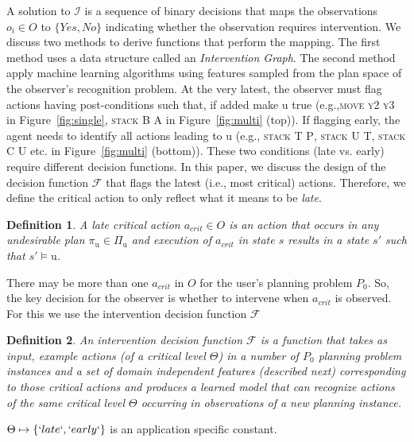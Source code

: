\documentclass[letterpaper]{article}
\theoremstyle{plain}
\newtheorem{definition}{Definition}
\begin{document}
A solution to $\mathcal{I}$ is a sequence of binary decisions that maps the observations $o_i\in O$ to $\lbrace Yes,No\rbrace$ indicating whether the observation requires intervention. 
We discuss two methods to derive functions that perform the mapping. 
The first method uses a data structure called an \textit{Intervention Graph}. 
The second method apply machine learning algorithms using features sampled from the plan space of the observer's recognition problem.
At the very latest, the observer must flag actions having post-conditions such that, if added make $\mathrm{u}$ true (e.g.,\textsc{move y2 y3} in Figure~\ref{fig:single}, \textsc{stack B A} in Figure~\ref{fig:multi} (top)). 
If flagging early, the agent needs to identify all actions leading to $\mathrm{u}$ (e.g., \textsc{stack T P}, \textsc{stack U T}, \textsc{stack C U} etc. in Figure~\ref{fig:multi} (bottom)). 
These two conditions (late vs. early) require different decision functions. 
In this paper, we discuss the design of the decision function $\mathcal{F}$ that flags the latest (i.e., most critical) actions. Therefore, we define the critical action to only reflect what it means to be \textit{late}.
\begin{definition}
A \textnormal{late critical action} $a_{crit} \in O$ is an action that occurs in any undesirable plan $\pi_{\mathrm{u}}\in \Pi_{\mathrm{u}}$ and execution of $a_{crit}$ in state $s$ results in a state $s\prime$ such that $s\prime\models \mathrm{u}$.
\end{definition}
\noindent There may be more than one $a_{crit}$ in $O$ for the user's planning problem $P_0$. So, the key decision for the observer is whether to intervene when $a_{crit}$ is observed. For this we use the intervention decision function $\mathcal{F}$
\begin{definition}
An \textnormal{intervention decision function} $\mathcal{F}$ is a function that takes as input, example actions (of a critical level $\Theta$) in a number of $P_0$ planning problem instances and a set of domain independent features (described next) corresponding to those critical actions and produces a learned model that can recognize actions of the same critical level $\Theta$ occurring in observations of a new planning instance.
\end{definition}
\noindent$\Theta\mapsto\lbrace `late`,`early`\rbrace$ is an application specific constant.

\end{document}
